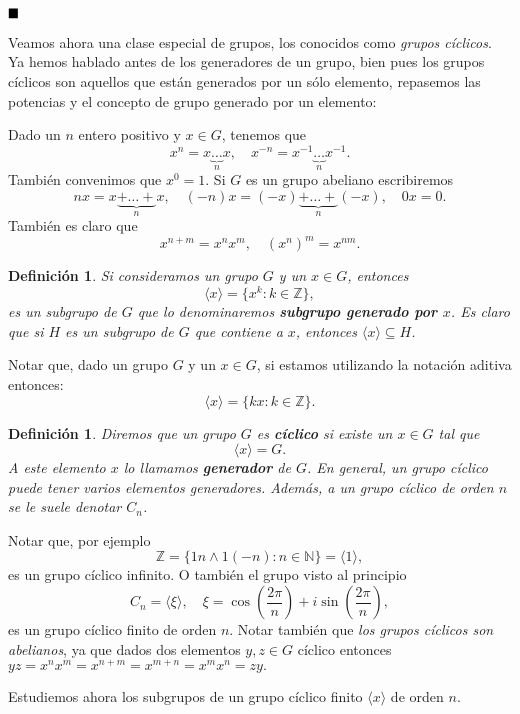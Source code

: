 \documentclass[12pt]{article}
\newtheorem{definition}[theorem]{Definición}
\begin{document}
$\hfill \blacksquare$

Veamos ahora una clase especial de grupos, los conocidos como \textit{grupos cíclicos}. Ya hemos hablado antes de los generadores de un grupo, bien pues los grupos cíclicos son aquellos que están generados por un sólo elemento, repasemos las potencias y el concepto de grupo generado por un elemento:

Dado un $n$ entero positivo y $x\in G$, tenemos que $$x^n = x\underbrace{\ldots}_{n} x, \quad x^{-n} = x^{-1} \underbrace{\ldots}_n x^{-1}.$$ También convenimos que $x^0 = 1$. Si $G$ es un grupo abeliano escribiremos $$nx = x\underbrace{+\ldots +}_n x, \quad (-n)x=(-x)\underbrace{+\ldots +}_n(-x), \quad 0x = 0.$$ También es claro que $$x^{n+m} = x^nx^m, \quad (x^n)^m=x^{nm}.$$

\begin{definition}Si consideramos un grupo $G$ y un $x\in G$, entonces $$\langle x \rangle = \lbrace x^k:k \in \mathbb{Z} \rbrace,$$ es un subgrupo de $G$ que lo denominaremos \textbf{subgrupo generado por $x$}. Es claro que si $H$ es un subgrupo de $G$ que contiene a $x$, entonces $\langle x \rangle \subseteq H$.
\end{definition}

Notar que, dado un grupo $G$ y un $x \in G$, si estamos utilizando la notación aditiva entonces: $$\langle x \rangle = \lbrace kx : k \in \mathbb{Z} \rbrace.$$

\begin{definition}Diremos que un grupo $G$ es \textbf{cíclico} si existe un $x \in G$ tal que $$\langle x \rangle = G.$$ A este elemento $x$ lo llamamos \textbf{generador} de $G$. En general, un grupo cíclico puede tener varios elementos generadores. Además, a un grupo cíclico de orden $n$ se le suele denotar $C_n$.
\end{definition}

Notar que, por ejemplo $$\mathbb{Z} = \lbrace 1n \wedge 1(-n) :n \in \mathbb{N} \rbrace= \langle 1 \rangle,$$ es un grupo cíclico infinito. O también el grupo visto al principio $$C_n = \langle \xi \rangle, \quad \xi = \cos\left(\dfrac{2\pi}{n}\right)+i\sin\left(\dfrac{2\pi}{n}\right),$$ es un grupo cíclico finito de orden $n$. Notar también que \textit{los grupos cíclicos son abelianos}, ya que dados dos elementos $y,z \in G$ cíclico entonces $yz = x^nx^m=x^{n+m}=x^{m+n} = x^mx^n=zy.$

Estudiemos ahora los subgrupos de un grupo cíclico finito $\langle x \rangle$ de orden $n$.
\end{document}
